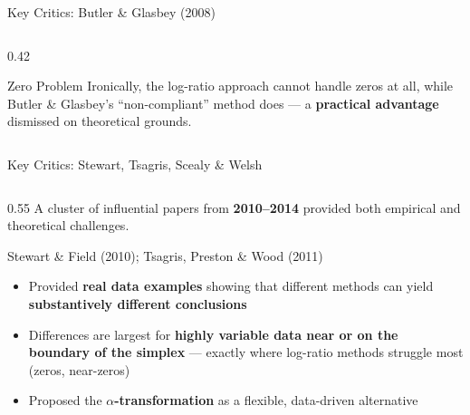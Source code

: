 \begin{frame}{Key Critics: Butler \& Glasbey (2008)}
\begin{columns}[T]
\begin{column}{0.42\textwidth}
    \vspace{0.3cm}
    \begin{block}{Zero Problem}
      Ironically, the log-ratio approach cannot handle zeros at
      all, while Butler \& Glasbey's ``non-compliant'' method
      does — a \textbf{practical advantage} dismissed on
      theoretical grounds.
    \end{block}
  \end{column}
\end{columns}

\end{frame}

\begin{frame}{Key Critics: Stewart, Tsagris, Scealy \& Welsh}

\begin{columns}[T]
  \begin{column}{0.55\textwidth}
    A cluster of influential papers from \textbf{2010--2014}
    provided both empirical and theoretical challenges.

    \vspace{0.3cm}
    \begin{block}{Stewart \& Field (2010); Tsagris, Preston \& Wood (2011)}
      \begin{itemize}
        \item Provided \textbf{real data examples} showing that
              different methods can yield \textbf{substantively
              different conclusions}
        \item Differences are largest for \textbf{highly variable
              data near or on the boundary of the simplex} — exactly
              where log-ratio methods struggle most (zeros,
              near-zeros)
        \item Proposed the \textbf{$\alpha$-transformation} as a
              flexible, data-driven alternative
      \end{itemize}
    \end{block}
  \end{column}


\end{columns}
\end{frame}

